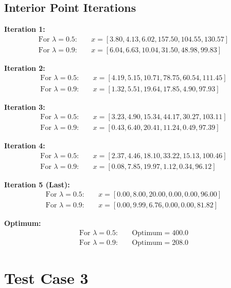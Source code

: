 \documentclass[12pt, legalpaper]{exam}
\begin{document}
\subsection*{Interior Point Iterations}
 
\textbf{Iteration 1:}
\begin{align*}
    \text{For } \lambda = 0.5: & \quad x = [ 3.80, 4.13, 6.02, 157.50, 104.55, 130.57 ] \\
    \text{For } \lambda = 0.9: & \quad x = [ 6.04, 6.63, 10.04, 31.50, 48.98, 99.83 ]
\end{align*}
 
\textbf{Iteration 2:}
\begin{align*}
    \text{For } \lambda = 0.5: & \quad x = [ 4.19, 5.15, 10.71, 78.75, 60.54, 111.45 ] \\
    \text{For } \lambda = 0.9: & \quad x = [ 1.32, 5.51, 19.64, 17.85, 4.90, 97.93 ]
\end{align*}
 
\textbf{Iteration 3:}
\begin{align*}
    \text{For } \lambda = 0.5: & \quad x = [ 3.23, 4.90, 15.34, 44.17, 30.27, 103.11 ] \\
    \text{For } \lambda = 0.9: & \quad x = [ 0.43, 6.40, 20.41, 11.24, 0.49, 97.39 ]
\end{align*}
 
\textbf{Iteration 4:}
\begin{align*}
    \text{For } \lambda = 0.5: & \quad x = [ 2.37, 4.46, 18.10, 33.22, 15.13, 100.46 ] \\
    \text{For } \lambda = 0.9: & \quad x = [ 0.08, 7.85, 19.97, 1.12, 0.34, 96.12 ]
\end{align*}
 
\textbf{Iteration 5 (Last):}
\begin{align*}
    \text{For } \lambda = 0.5: & \quad x = [ 0.00, 8.00, 20.00, 0.00, 0.00, 96.00 ] \\
    \text{For } \lambda = 0.9: & \quad x = [ 0.00, 9.99, 6.76, 0.00, 0.00, 81.82 ]
\end{align*}
 
\textbf{Optimum:}
\begin{align*}
    \text{For } \lambda = 0.5: & \quad \text{Optimum} = 400.0 \\
    \text{For } \lambda = 0.9: & \quad \text{Optimum} = 208.0
\end{align*}
\newpage
\section*{Test Case 3}
 
\end{document}
